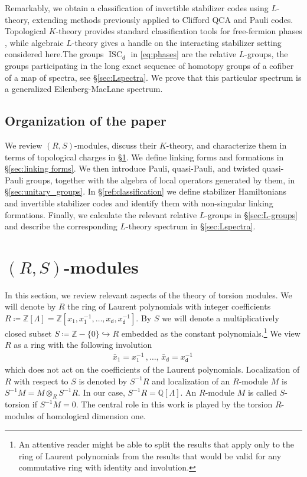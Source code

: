 \documentclass[sn-mathphys-num]{sn-jnl}
\theoremstyle{definition}
\numberwithin{equation}{section}
\theoremstyle{definition}
\def\IQ{\mathbb{Q}}
\def\IZ{{\mathbb{Z}}}
\def\La{{\Lambda}}
\newcommand{\dd}{{\mathsf{d}}} %
\begin{document}
Remarkably, we obtain a classification of invertible stabilizer codes using $L$-theory, extending methods previously applied to Clifford QCA and Pauli codes. Topological $K$-theory provides standard classification tools for free-fermion phases \cite{Kitaev_2009,freed2013twisted}, while algebraic $L$-theory gives a handle on the interacting stabilizer setting considered here.The groups $\operatorname{ISC}_{\dd}$ in \eqref{eq:phases} are the relative $L$-groups, the groups participating in the long exact sequence of homotopy groups of a cofiber of a map of spectra, see \S \ref{sec:Lspectra}. We prove that this particular spectrum is a generalized Eilenberg-MacLane spectrum. 
\subsection*{Organization of the paper}
We review $(R,S)$-modules, discuss their $K$-theory, and characterize them in terms of topological charges in \S \ref{sec:RS_mods}. We define linking forms and formations in \S \ref{sec:linking forms}. We then introduce Pauli, quasi-Pauli, and twisted quasi-Pauli groups, together with the algebra of local operators generated by them, in \S \ref{sec:unitary_groups}. In \S \ref{ref:classification} we define stabilizer Hamiltonians and invertible stabilizer codes and identify them with non-singular linking formations. Finally, we calculate the relevant relative $L$-groups in \S \ref{sec:L-groups} and describe the corresponding $L$-theory spectrum in \S \ref{sec:Lspectra}.

\section{$(R,S)$-modules}\label{sec:RS_mods}
 In this section, we review relevant aspects of the theory of torsion modules. We will denote by $R$ the ring of Laurent polynomials with integer coefficients $R\coloneqq \IZ[\La]=\IZ[x_1,x_1^{-1},\ldots, x_{\dd},x_{\dd}^{-1}]$. By $S$ we will denote a multiplicatively closed subset $S\coloneqq\IZ-\{0\}\hookrightarrow R$  embedded as the constant polynomials.\footnote{ An attentive reader might be able to split the results that apply only to the ring of Laurent polynomials from the results that would be valid for any commutative ring with identity and involution.}
 We view $R$ as a ring with the following involution
\begin{align}
   \bar x_1=x_1^{-1}\,,\ldots,\, \bar x_{\dd}=x_{\dd}^{-1}\,
\end{align}
which does not act on the coefficients of the Laurent polynomials. 
 Localization of $R$ with respect to $S$ is denoted by $S^{-1}R$ and localization of an $R$-module $M$ is $S^{-1}M=M\otimes_R S^{-1}R$. In our case, $S^{-1}R=\IQ[\La]$. An $R$-module $M$ is called $S$-torsion if $S^{-1}M=0$. The central role in this work is played by the torsion $R$-modules of homological dimension one. 
 
\end{document}

